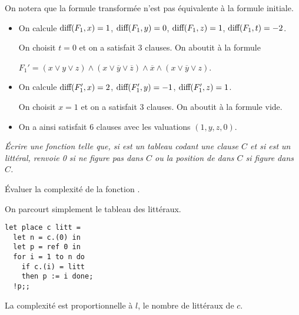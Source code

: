 \begin{Answer}

On notera que la formule transformée n'est pas équivalente à la formule initiale.
\begin{itemize}
  \item On calcule $\text{\rm diff}(F_1,x) = 1$, $\text{\rm diff}(F_1,y) = 0$, $\text{\rm diff}(F_1,z) = 1$, $\text{\rm diff}(F_1,t) = -2$.

On choisit $t = 0$ et on a satisfait 3 clauses. On aboutit à la formule 

$F_1'=(x \lor y \lor z)\land (x \lor \overline y \lor \overline z)\land  \overline x\land (x \lor \overline y \lor z)$.

\item On calcule $\text{\rm diff}(F_1',x) = 2$, $\text{\rm diff}(F_1',y) = -1$, $\text{\rm diff}(F_1',z) = 1$.

On choisit $x=1$ et on a satisfait 3 clauses. On aboutit à la formule vide.

\item On a ainsi satisfait 6 clauses avec les valuations $(1,y,z,0)$.
\end{itemize}
\end{Answer}
\begin{Exercise}\it
Écrire une fonction  telle que, si  est un tableau codant une
clause $C$ et si  est un littéral,  renvoie 0 si  ne figure pas dans $C$ ou la position de  dans $C$ si  figure dans $C$.

Évaluer la complexité de la fonction .
\end{Exercise}
\begin{Answer}On parcourt simplement le tableau des littéraux.

\begin{lstlisting}
let place c litt =
  let n = c.(0) in
  let p = ref 0 in
  for i = 1 to n do
    if c.(i) = litt
    then p := i done;
  !p;;
\end{lstlisting}
La complexité est proportionnelle à $l$, le nombre de littéraux de $c$.
\end{Answer}
